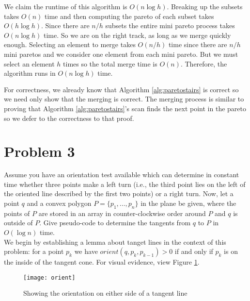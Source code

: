 \documentclass[11pt]{article}
\begin{document}
\begin{enumerate}
    We claim the runtime of this algorithm is $O(n \log h)$.
    Breaking up the subsets takes $O(n)$ time and then computing the pareto of each subset takes $O(h \log h)$.
    Since there are $n/h$ subsets the entire mini pareto process takes $O(n \log h)$ time.
    So we are on the right track, as long as we merge quickly enough.
    Selecting an element to merge takes $O(n/h)$ time since there are $n/h$ mini paretos and we consider one element from each mini pareto.
    But we must select an element $h$ times so the total merge time is $O(n)$.
    Therefore, the algorithm runs in $O(n \log h)$ time.

    For correctness, we already know that Algorithm \ref{alg:paretostairs} is correct so we need only show that the merging is correct.
    The merging process is similar to proving that Algorithm \ref{alg:paretostairs}'s scan finds the next point in the pareto so we defer to the correctness to that proof.

\end{enumerate}

\newpage
\section*{Problem 3}

Assume you have an orientation test available which can determine in constant
time whether three points make a left turn (i.e., the third point lies on the
left of the oriented line described by the first two points) or a right turn.
Now, let a point $q$ and a convex polygon $P = \{ p_1, \ldots , p_n \}$ in the
plane be given, where the points of $P$ are stored in an array in
counter-clockwise order around $P$ and $q$ is outside of $P$. Give pseudo-code
to determine the tangents from $q$ to $P$ in $O(\log n)$ time. \\

\answer
We begin by establishing a lemma about tanget lines in the context of this problem:
for a point $p_k$ we have $orient(q, p_k, p_{k-1}) > 0$ if and only if $p_k$ is on the inside of the tangent cone.
For visual evidence, view Figure \ref{fig:orient}.

\begin{figure}[h]
    \centering
    \texttt{[image: orient]}
    \caption{Showing the orientation on either side of a tangent line}
    \label{fig:orient}
\end{figure}
\end{document}
